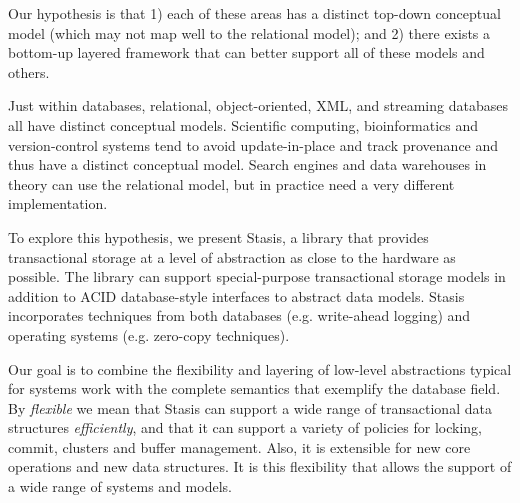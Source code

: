 \documentclass[letterpaper,twocolumn,10pt]{article}
\newcommand{\yad}{Stasis\xspace}
\newcommand{\eat}[1]{}
\begin{document}
Our hypothesis is that 1) each of these areas has a distinct top-down
conceptual model (which may not map well to the relational model); and
2) there exists a bottom-up layered framework that can better support all of these
models and others. 

Just within databases, relational, object-oriented, XML, and streaming
databases all have distinct conceptual models.  Scientific computing,
bioinformatics and version-control systems tend to avoid
update-in-place and track provenance and thus have a distinct
conceptual model.  Search engines and data warehouses in theory can
use the relational model, but in practice need a very different
implementation.



\eat{
Examples of real world systems that currently fall into this category
are web search engines, document repositories, large-scale web-email
services, map and trip planning services, ticket reservation systems,
photo and video repositories, bioinformatics, version control systems,
work-flow applications, CAD/VLSI applications and directory services.

In short, we believe that a fundamental architectural shift in
transactional storage is necessary before general-purpose storage
systems are of practical use to modern applications.
Until this change occurs, databases' imposition of unwanted
abstraction upon their users will restrict system designs and
implementations.
}

To explore this hypothesis, we present \yad, a library that provides
transactional storage at a level of abstraction as close to the
hardware as possible.  The library can support special-purpose
transactional storage models in addition to ACID database-style
interfaces to abstract data models.  \yad incorporates techniques from both
databases (e.g. write-ahead logging) and operating systems
(e.g. zero-copy techniques).

Our goal is to combine the flexibility and layering of low-level
abstractions typical for systems work with the complete semantics
that exemplify the database field.
By {\em flexible} we mean that \yad{}  can support a wide
range of transactional data structures {\em efficiently}, and that it can support a variety
of policies for locking, commit, clusters and buffer management.
Also, it is extensible for new core operations
and new data structures. It is this flexibility that allows the
support of a wide range of systems and models.
\end{document}
